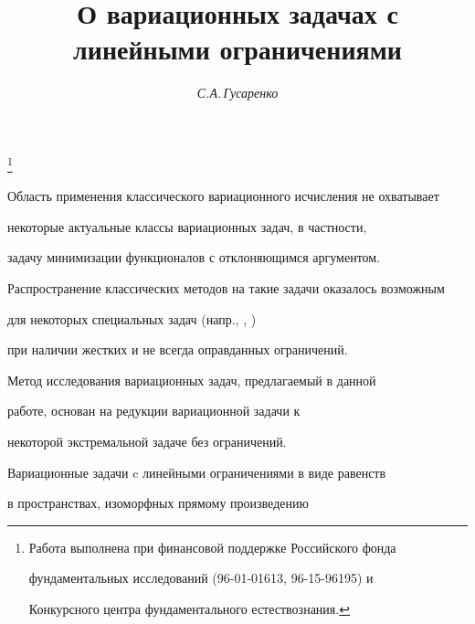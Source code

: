 \author{\it С.А.\,Гусаренко}




\title{О вариационных задачах с линейными ограничениями}


\thanks{Работа выполнена при финансовой поддержке Российского фонда


фундаментальных исследований (96-01-01613, 96-15-96195) и


Конкурсного центра фундаментального естествознания.}





\date{}




\pagestyle{plain} %







\maketitle


\label{begin}





Область применения классического вариационного исчисления не охватывает


некоторые актуальные классы вариационных задач, в частности,


задачу минимизации функционалов с отклоняющимся аргументом.


Распространение классических методов на такие задачи оказалось возможным


для некоторых специальных задач (напр., \cite{K}, \cite{KS})


при наличии жестких и не всегда оправданных ограничений.





Метод исследования вариационных задач, предлагаемый в данной


работе, основан на редукции вариационной задачи к


некоторой экстремальной задаче без ограничений.





Вариационные задачи c линейными ограничениями в виде равенств


в пространствах, изоморфных прямому произведению


